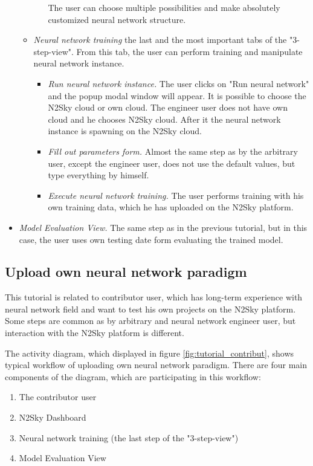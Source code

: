 \begin{itemize}
\begin{itemize}
\begin{itemize}
The user can choose multiple possibilities and make absolutely customized neural network structure.

\end{itemize}
\item \emph{Neural network training} the last and the most important tabs of the "3-step-view". From this tab, the user can perform training and manipulate neural network instance.
\begin{itemize}
\item \emph{Run neural network instance.} The user clicks on "Run neural network" and the popup modal window will appear. It is possible to choose the N2Sky cloud or own cloud. The engineer user does not have own cloud and he chooses N2Sky cloud. After it the neural network instance is spawning on the N2Sky cloud.
\item \emph{Fill out parameters form.} Almost the same step as by the arbitrary user, except the engineer user, does not use the default values, but type everything by himself.
\item \emph{Execute neural network training.} The user performs training with his own training data, which he has uploaded on the N2Sky platform.
\end{itemize}
\end{itemize}
 \item \emph{Model Evaluation View.} The same step as in the previous tutorial, but in this case, the user uses own testing date form evaluating the trained model.
\end{itemize}



\subsection{Upload own neural network paradigm}\label{Upload own neural network paradigm}

This tutorial is related to contributor user, which has long-term experience with neural network field and want to test his own projects on the N2Sky platform.
Some steps are common as by arbitrary and neural network engineer user, but interaction with the N2Sky platform is different.


The activity diagram, which displayed in figure \ref{fig:tutorial_contribut}, shows typical workflow of uploading own neural network paradigm. There are four main components of the diagram, which are participating in this workflow: 
\begin{enumerate}
\item The contributor user
\item N2Sky Dashboard
\item Neural network training (the last step of the "3-step-view")
\item Model Evaluation View
\end{enumerate}

